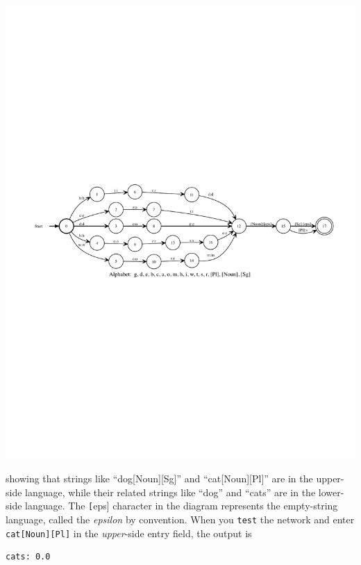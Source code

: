 \begin{center}
\includegraphics[width=135mm]{images/simplenounsgpl.pdf}
\end{center}


\noindent
showing that strings like ``dog[Noun][Sg]'' and ``cat[Noun][Pl]'' are in the upper-side
language, while their related strings like ``dog'' and ``cats'' are in the lower-side language. 
The \texttt[eps] character in the diagram represents the empty-string language, called the
\emph{epsilon} by convention.
When you \texttt{test} the network and enter \texttt{cat[Noun][Pl]} in the \emph{upper}-side
entry field, the output is 

\begin{Verbatim}
cats: 0.0
\end{Verbatim}

